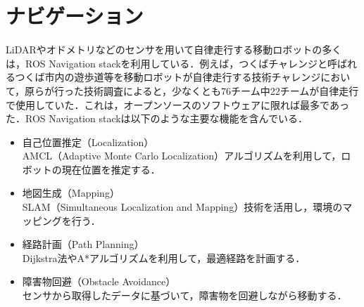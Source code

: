
\section{ナビゲーション}\label{sec:navigation-stack}
LiDARやオドメトリなどのセンサを用いて自律走行する移動ロボットの多くは，ROS Navigation stack\cite{nav1,nav2}を利用している．例えば，つくばチャレンジと呼ばれるつくば市内の遊歩道等を移動ロボットが自律走行する技術チャレンジにおいて，原らが行った技術調査\cite{robomech2024-hara}によると，少なくとも76チーム中22チームが自律走行で使用していた．これは，オープンソースのソフトウェアに限れば最多であった．ROS Navigation stackは以下のような主要な機能を含んでいる．

\begin{itemize}
     \item 自己位置推定（Localization）\\
     AMCL（Adaptive Monte Carlo Localization）アルゴリズムを利用して，ロボットの現在位置を推定する．
     \item 地図生成（Mapping）\\
     SLAM（Simultaneous Localization and Mapping）技術を活用し，環境のマッピングを行う．
     \item 経路計画（Path Planning）\\
     Dijkstra法\cite{dijkstra2022note}やA*アルゴリズム\cite{hart1968formal-astar}を利用して，最適経路を計画する．
     \item 障害物回避（Obstacle Avoidance）\\
     センサから取得したデータに基づいて，障害物を回避しながら移動する．
\end{itemize}

\newpage
